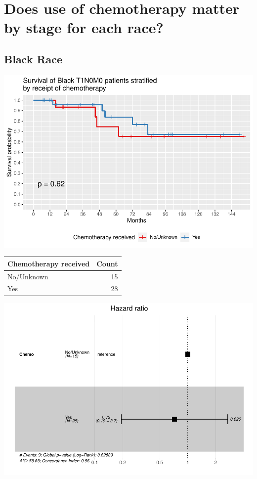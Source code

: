 \documentclass[
]{article}
\begin{document}
\hypertarget{does-use-of-chemotherapy-matter-by-stage-for-each-race}{%
\section{Does use of chemotherapy matter by stage for each
race?}\label{does-use-of-chemotherapy-matter-by-stage-for-each-race}}

\hypertarget{black-race-1}{%
\subsection{Black Race}\label{black-race-1}}

\includegraphics{EarlyOvaryRace_files/figure-latex/unnamed-chunk-14-1.pdf}

\begin{tabular}[t]{l|r}
\hline
Chemotherapy received & Count\\
\hline
No/Unknown & 15\\
\hline
Yes & 28\\
\hline
\end{tabular}

\includegraphics{EarlyOvaryRace_files/figure-latex/unnamed-chunk-15-1.pdf}
\end{document}
